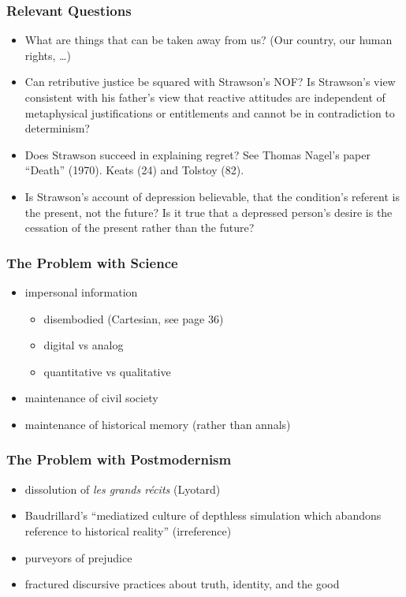 \documentclass[xcolor=dvipsnames]{beamer}
\begin{document}
\begin{frame}
  \frametitle{Relevant Questions}
  \begin{itemize}
  \item What are things that can be taken away from us? (Our country,
    our human rights, {\ldots})
  \item Can retributive justice be squared with Strawson's NOF? Is
    Strawson's view consistent with his father's view that reactive
    attitudes are independent of metaphysical justifications or
    entitlements and cannot be in contradiction to determinism?
  \item Does Strawson succeed in explaining regret? See Thomas Nagel's
    paper ``Death'' (1970). Keats (24) and Tolstoy (82). 
  \item Is Strawson's account of depression believable, that the
    condition's referent is the present, not the future? Is it true
    that a depressed person's desire is the cessation of the present
    rather than the future?
  \end{itemize}
\end{frame}

\begin{frame}
  \frametitle{The Problem with Science}
  \begin{itemize}
  \item impersonal information
    \begin{itemize}
    \item disembodied (Cartesian, see page 36)
    \item digital vs analog
    \item quantitative vs qualitative
    \end{itemize}
  \item maintenance of civil society
  \item maintenance of historical memory (rather than annals)
  \end{itemize}
\end{frame}

\begin{frame}
  \frametitle{The Problem with Postmodernism}
  \begin{itemize}
  \item dissolution of \emph{les grands r{\'e}cits} (Lyotard)
  \item Baudrillard's ``mediatized culture of depthless simulation
    which abandons reference to historical reality'' (irreference)
  \item purveyors of prejudice
  \item fractured discursive practices about truth, identity, and the good
  \end{itemize}
\end{frame}
\end{document}
